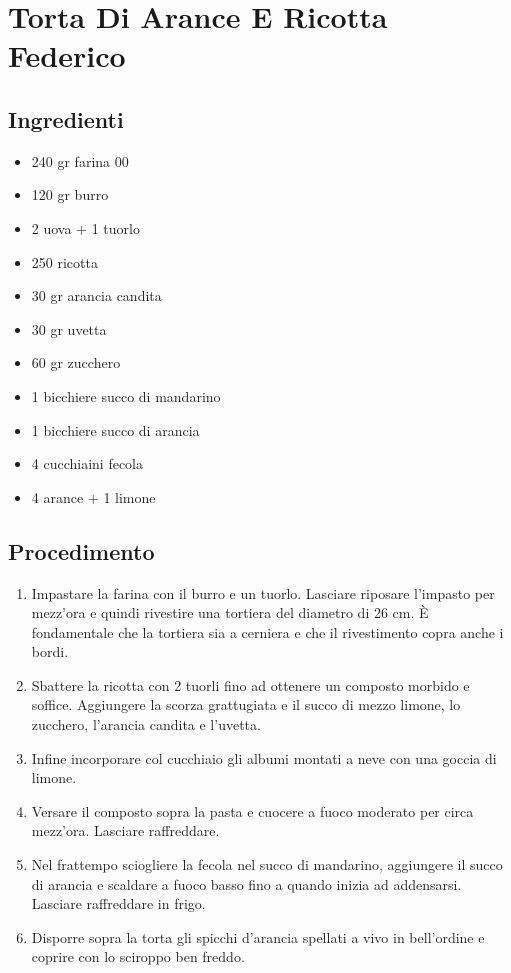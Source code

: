 \section{Torta Di Arance E Ricotta Federico}
\subsection{Ingredienti}
\begin{itemize}
\item 240 gr farina 00  
\item 120 gr burro  
\item 2 uova + 1 tuorlo  
\item 250 ricotta  
\item 30 gr arancia candita  
\item 30 gr uvetta  
\item 60 gr zucchero  
\item 1 bicchiere succo di mandarino  
\item 1 bicchiere succo di arancia  
\item 4 cucchiaini fecola  
\item 4 arance + 1 limone
\end{itemize}
\subsection{Procedimento}
\begin{enumerate}
\item  Impastare la farina con il burro e un tuorlo. Lasciare riposare l'impasto per mezz'ora e quindi rivestire una tortiera del diametro di 26 cm. È fondamentale che la tortiera sia a cerniera e che il rivestimento copra anche i bordi.  
\item  Sbattere la ricotta con 2 tuorli fino ad ottenere un composto morbido e soffice. Aggiungere la scorza grattugiata e il succo di mezzo limone, lo zucchero, l'arancia candita e l'uvetta.  
\item  Infine incorporare col cucchiaio gli albumi montati a neve con una goccia di limone.  
\item  Versare il composto sopra la pasta e cuocere a fuoco moderato per circa mezz'ora. Lasciare raffreddare.  
\item  Nel frattempo sciogliere la fecola nel succo di mandarino, aggiungere il succo di arancia e scaldare a fuoco basso fino a quando inizia ad addensarsi. Lasciare raffreddare in frigo.  
\item  Disporre sopra la torta gli spicchi d'arancia spellati a vivo in bell'ordine e coprire con lo sciroppo ben freddo.
\end{enumerate}
